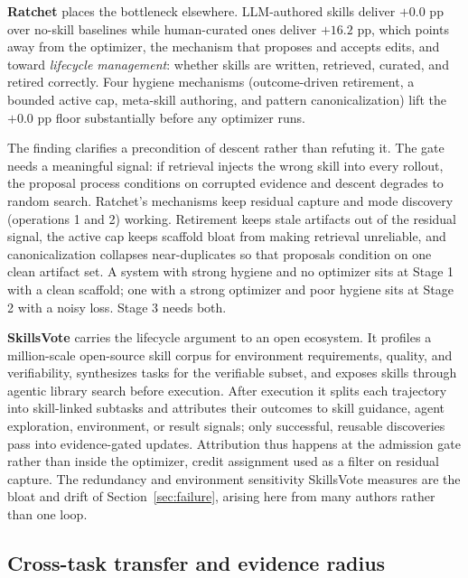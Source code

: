 \documentclass[
  11pt,
]{article}
\begin{document}
\textbf{Ratchet} \cite{zhang2026ratchet} places the bottleneck elsewhere. LLM-authored skills deliver \(+0.0\) pp over no-skill baselines while human-curated ones deliver \(+16.2\) pp, which points away from the optimizer, the mechanism that proposes and accepts edits, and toward \emph{lifecycle management}: whether skills are written, retrieved, curated, and retired correctly. Four hygiene mechanisms (outcome-driven retirement, a bounded active cap, meta-skill authoring, and pattern canonicalization) lift the \(+0.0\) pp floor substantially before any optimizer runs.

The finding clarifies a precondition of descent rather than refuting it. The gate needs a meaningful signal: if retrieval injects the wrong skill into every rollout, the proposal process conditions on corrupted evidence and descent degrades to random search. Ratchet's mechanisms keep residual capture and mode discovery (operations 1 and 2) working. Retirement keeps stale artifacts out of the residual signal, the active cap keeps scaffold bloat from making retrieval unreliable, and canonicalization collapses near-duplicates so that proposals condition on one clean artifact set. A system with strong hygiene and no optimizer sits at Stage 1 with a clean scaffold; one with a strong optimizer and poor hygiene sits at Stage 2 with a noisy loss. Stage 3 needs both.

\textbf{SkillsVote} \cite{liu2026skillsvote} carries the lifecycle argument to an open ecosystem. It profiles a million-scale open-source skill corpus for environment requirements, quality, and verifiability, synthesizes tasks for the verifiable subset, and exposes skills through agentic library search before execution. After execution it splits each trajectory into skill-linked subtasks and attributes their outcomes to skill guidance, agent exploration, environment, or result signals; only successful, reusable discoveries pass into evidence-gated updates. Attribution thus happens at the admission gate rather than inside the optimizer, credit assignment used as a filter on residual capture. The redundancy and environment sensitivity SkillsVote measures are the bloat and drift of Section~\ref{sec:failure}, arising here from many authors rather than one loop.

\subsection{Cross-task transfer and evidence radius}\label{app:families-8}
\end{document}
